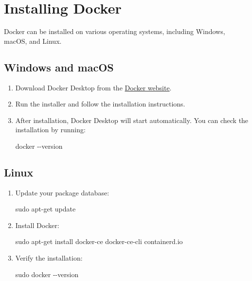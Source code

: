 \documentclass[
  letterpaper,
  DIV=11,
  numbers=noendperiod]{scrreprt}
\newenvironment{Shaded}{\begin{snugshade}}{\end{snugshade}}
\newcommand{\AttributeTok}[1]{\textcolor[rgb]{0.40,0.45,0.13}{#1}}
\newcommand{\ExtensionTok}[1]{\textcolor[rgb]{0.00,0.23,0.31}{#1}}
\newcommand{\FunctionTok}[1]{\textcolor[rgb]{0.28,0.35,0.67}{#1}}
\newcommand{\NormalTok}[1]{\textcolor[rgb]{0.00,0.23,0.31}{#1}}
\begin{document}
\section{Installing Docker}\label{installing-docker-2}

Docker can be installed on various operating systems, including Windows,
macOS, and Linux.

\subsection{Windows and macOS}\label{windows-and-macos}

\begin{enumerate}
\def\labelenumi{\arabic{enumi}.}
\item
  Download Docker Desktop from the
  \href{https://www.docker.com/products/docker-desktop}{Docker website}.
\item
  Run the installer and follow the installation instructions.
\item
  After installation, Docker Desktop will start automatically. You can
  check the installation by running:

\begin{Shaded}
\begin{Highlighting}[]
\ExtensionTok{docker} \AttributeTok{{-}{-}version}
\end{Highlighting}
\end{Shaded}
\end{enumerate}

\subsection{Linux}\label{linux-2}

\begin{enumerate}
\def\labelenumi{\arabic{enumi}.}
\item
  Update your package database:

\begin{Shaded}
\begin{Highlighting}[]
\FunctionTok{sudo}\NormalTok{ apt{-}get update}
\end{Highlighting}
\end{Shaded}
\item
  Install Docker:

\begin{Shaded}
\begin{Highlighting}[]
\FunctionTok{sudo}\NormalTok{ apt{-}get install docker{-}ce docker{-}ce{-}cli containerd.io}
\end{Highlighting}
\end{Shaded}
\item
  Verify the installation:

\begin{Shaded}
\begin{Highlighting}[]
\FunctionTok{sudo}\NormalTok{ docker }\AttributeTok{{-}{-}version}
\end{Highlighting}
\end{Shaded}
\end{enumerate}
\end{document}
